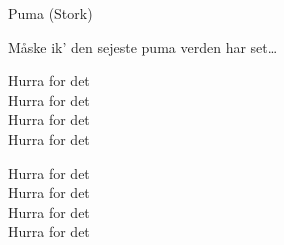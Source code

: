\begin{song}{Puma (Stork)}{}
  \begin{SBChorus}
    Måske ik' den sejeste puma verden har set\ldots
  \end{SBChorus}

  \begin{SBSection*}
    Hurra for det\\
    Hurra for det\\
    Hurra for det\\
    Hurra for det
  \end{SBSection*}
  \begin{SBSection*}
    Hurra for det\\
    Hurra for det\\
    Hurra for det\\
    Hurra for det
  \end{SBSection*}

\end{song}